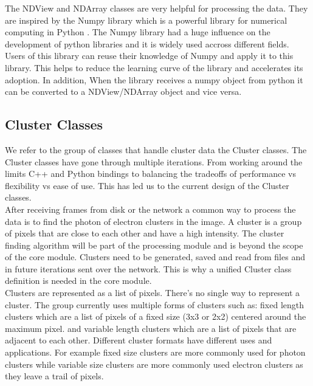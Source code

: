 \begin{spacing}{1.2}
    The NDView and NDArray classes are very helpful for processing the data. They are inspired by the Numpy library
    which is a powerful library for numerical computing in Python \cite{harris2020array}. The Numpy library had a huge
    influence on the development of python libraries and it is widely used accross different fields.
    Users of this library can reuse their knowledge of Numpy and apply it to this library. This helps
    to reduce the learning curve of the library and accelerates its adoption.
    In addition, When the library receives a numpy object from python it can be converted to a NDView/NDArray object and vice versa. \\

    \subsection{Cluster Classes}
    We refer to the group of classes that handle cluster data the Cluster classes. The Cluster classes have gone through multiple iterations.
    From working around the limits C++ and Python bindings to
    balancing the tradeoffs of performance vs flexibility vs ease of use. This has led us to the current design of the Cluster classes.\\

    After receiving frames from disk or the network a common way to process the data is to find the photon of electron clusters in
    the image. A cluster is a group of pixels that are close to each other and have a high intensity. The cluster finding algorithm
    will be part of the processing module and is beyond the scope of the core module. Clusters need to be generated, saved and read from
    files and in future iterations sent over the network. This is why a unified Cluster class definition is needed in the core module.\\

    Clusters are represented as a list of pixels. There's no single way to represent a cluster. The group currently uses multiple
    forms of clusters such as: fixed length clusters which are a list of pixels of a fixed size (3x3 or 2x2) centered around the maximum pixel.
    and variable length clusters which are a list of pixels that are adjacent to each other. Different cluster formats have different uses and
    applications. For example fixed size clusters are more commonly used for photon clusters while variable size clusters are more commonly used
    electron clusters as they leave a trail of pixels.\\


\end{spacing}
